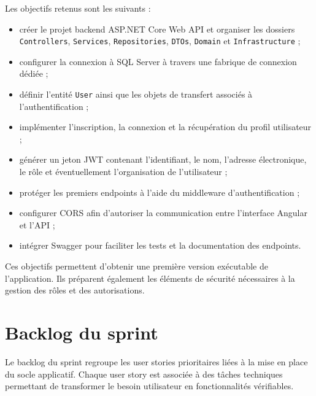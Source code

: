 \documentclass[12pt,a4paper]{report}
\begin{document}
Les objectifs retenus sont les suivants :

\begin{itemize}
    \item créer le projet backend ASP.NET Core Web API et organiser les dossiers \texttt{Controllers}, \texttt{Services}, \texttt{Repositories}, \texttt{DTOs}, \texttt{Domain} et \texttt{Infrastructure} ;
    \item configurer la connexion à SQL Server à travers une fabrique de connexion dédiée ;
    \item définir l'entité \texttt{User} ainsi que les objets de transfert associés à l'authentification ;
    \item implémenter l'inscription, la connexion et la récupération du profil utilisateur ;
    \item générer un jeton JWT contenant l'identifiant, le nom, l'adresse électronique, le rôle et éventuellement l'organisation de l'utilisateur ;
    \item protéger les premiers endpoints à l'aide du middleware d'authentification ;
    \item configurer CORS afin d'autoriser la communication entre l'interface Angular et l'API ;
    \item intégrer Swagger pour faciliter les tests et la documentation des endpoints.
\end{itemize}

Ces objectifs permettent d'obtenir une première version exécutable de l'application. Ils préparent également les éléments de sécurité nécessaires à la gestion des rôles et des autorisations.

\section{Backlog du sprint}

Le backlog du sprint regroupe les user stories prioritaires liées à la mise en place du socle applicatif. Chaque user story est associée à des tâches techniques permettant de transformer le besoin utilisateur en fonctionnalités vérifiables.
\end{document}
